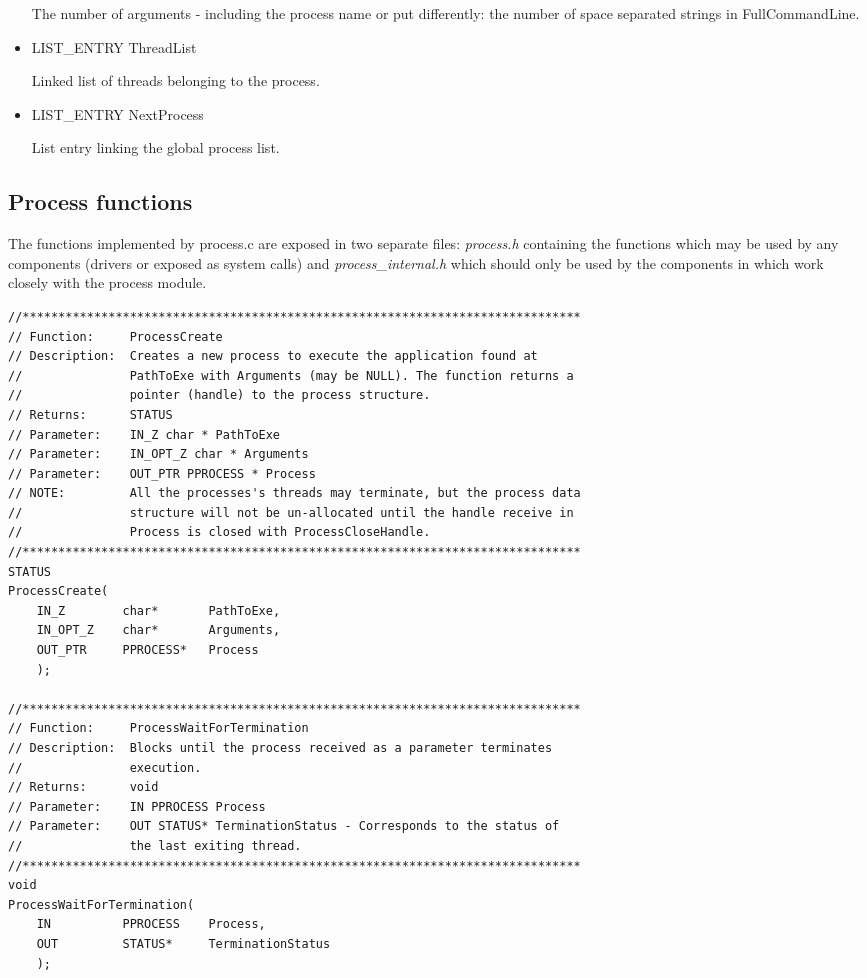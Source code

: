 \begin{appendices}
\begin{itemize}
	The number of arguments - including the process name or put differently: the number of space
separated strings in FullCommandLine.

	\item LIST\_ENTRY ThreadList

	Linked list of threads belonging to the process.

	\item LIST\_ENTRY NextProcess

	List entry linking the global process list.
\end{itemize}

\subsection{Process functions}

The functions implemented by process.c are exposed in two separate files: \textit{process.h}
containing the functions which may be used by any components (drivers or exposed as system calls)
and \textit{process\_internal.h} which should only be used by the components in \projectname which
work closely with the process module.

\begin{lstlisting}[caption={Process Public Interface},label={lst:ProcPublic}]
//******************************************************************************
// Function:     ProcessCreate
// Description:  Creates a new process to execute the application found at
//               PathToExe with Arguments (may be NULL). The function returns a
//               pointer (handle) to the process structure.
// Returns:      STATUS
// Parameter:    IN_Z char * PathToExe
// Parameter:    IN_OPT_Z char * Arguments
// Parameter:    OUT_PTR PPROCESS * Process
// NOTE:         All the processes's threads may terminate, but the process data
//               structure will not be un-allocated until the handle receive in
//               Process is closed with ProcessCloseHandle.
//******************************************************************************
STATUS
ProcessCreate(
    IN_Z        char*       PathToExe,
    IN_OPT_Z    char*       Arguments,
    OUT_PTR     PPROCESS*   Process
    );

//******************************************************************************
// Function:     ProcessWaitForTermination
// Description:  Blocks until the process received as a parameter terminates
//               execution.
// Returns:      void
// Parameter:    IN PPROCESS Process
// Parameter:    OUT STATUS* TerminationStatus - Corresponds to the status of
//               the last exiting thread.
//******************************************************************************
void
ProcessWaitForTermination(
    IN          PPROCESS    Process,
    OUT         STATUS*     TerminationStatus
    );


\end{lstlisting}
\end{appendices}
